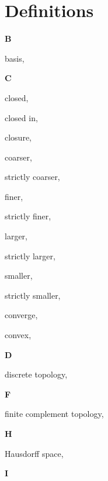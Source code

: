 \section*{Definitions}

\begin{multicols}{2}

\vspace{1em}\large{\textbf{B}}

basis, \pageref{def:Basis}

\vspace{1em}\large{\textbf{C}}

closed, \pageref{def:Closed}

\hspace{2em}closed in, \pageref{def:ClosedIn}

closure, \pageref{def:Closure}

coarser, \pageref{def:Comparable}

\hspace{2em}strictly coarser, \pageref{def:Comparable}

finer, \pageref{def:Comparable}

\hspace{2em}strictly finer, \pageref{def:Comparable}

larger, \pageref{def:Comparable}

\hspace{2em}strictly larger, \pageref{def:Comparable}

smaller, \pageref{def:Comparable}

\hspace{2em}strictly smaller, \pageref{def:Comparable}

converge, \pageref{def:Converge}

convex, \pageref{def:Convex}

\vspace{1em}\large{\textbf{D}}

discrete topology, \pageref{def:DiscreteTopology}

\vspace{1em}\large{\textbf{F}}

finite complement topology, \pageref{def:FiniteComplementTopology}

\vspace{1em}\large{\textbf{H}}

Hausdorff space, \pageref{def:HausdorffSpace}

\vspace{1em}\large{\textbf{I}}


\end{multicols}
